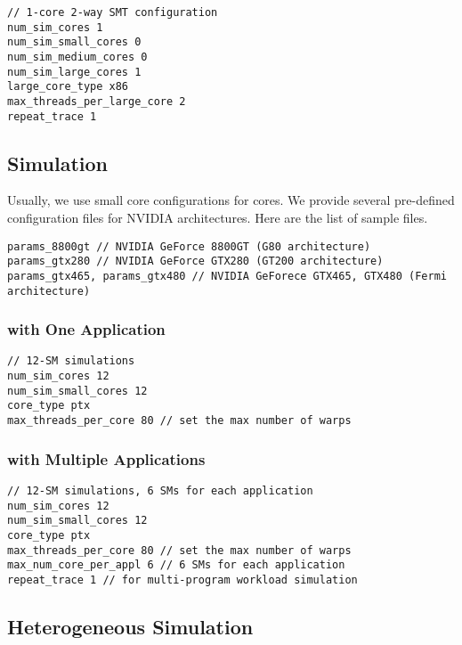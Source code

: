\smallskip
\begin{lstlisting}
// 1-core 2-way SMT configuration
num_sim_cores 1
num_sim_small_cores 0
num_sim_medium_cores 0
num_sim_large_cores 1
large_core_type x86
max_threads_per_large_core 2
repeat_trace 1
\end{lstlisting}
\smallskip



\subsection{\gpu Simulation}

Usually, we use small core configurations for \gpu cores. We provide
several pre-defined configuration files for NVIDIA architectures. Here
are the list of sample files.

\smallskip
\begin{lstlisting}
params_8800gt // NVIDIA GeForce 8800GT (G80 architecture)
params_gtx280 // NVIDIA GeForce GTX280 (GT200 architecture)
params_gtx465, params_gtx480 // NVIDIA GeForece GTX465, GTX480 (Fermi architecture)
\end{lstlisting}
\smallskip

\subsubsection{\gpu with One Application}
\smallskip
\begin{lstlisting}
// 12-SM simulations
num_sim_cores 12
num_sim_small_cores 12
core_type ptx
max_threads_per_core 80 // set the max number of warps 
\end{lstlisting}
\smallskip



\subsubsection{\gpu with Multiple Applications}

\smallskip
\begin{lstlisting}
// 12-SM simulations, 6 SMs for each application
num_sim_cores 12
num_sim_small_cores 12
core_type ptx
max_threads_per_core 80 // set the max number of warps 
max_num_core_per_appl 6 // 6 SMs for each application
repeat_trace 1 // for multi-program workload simulation
\end{lstlisting}
\smallskip


\subsection{Heterogeneous Simulation}

